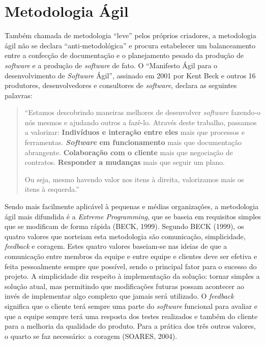 \chapter[Metodologia Ágil]{Metodologia Ágil}
Também chamada de metodologia “leve” pelos próprios criadores, a metodologia ágil não se declara “anti-metodológica” e procura estabelecer um balanceamento entre a confecção de documentação e o planejamento pesado da produção de \textit{software} e a produção de \textit{software} de fato. O “Manifesto Ágil para o desenvolvimento de \textit{Software} Ágil”, assinado em 2001 por Kent Beck  e outros 16 produtores, desenvolvedores e consultores de \textit{software}, declara as seguintes palavras:
\begin{quotation}
“Estamos descobrindo maneiras melhores de desenvolver \textit{software} fazendo-o nós mesmos e ajudando outros a fazê-lo. Através deste trabalho, passamos a valorizar:
	\textbf{Indivíduos e interação entre eles} mais que processos e ferramentas.
	\textbf{\textit{Software} em funcionamento} mais que documentação abrangente.
	\textbf{Colaboração com o cliente} mais que negociação de contratos.
	\textbf{Responder a mudanças} mais que seguir um plano.

Ou seja, mesmo havendo valor nos itens à direita, valorizamos mais os itens à esquerda.”
\end{quotation}

Sendo mais facilmente aplicável à pequenas e médias organizações, a metodologia ágil mais difundida é a \textit{Extreme Programming}, que se baseia em requisitos simples que se modificam de forma rápida (BECK, 1999). Segundo BECK (1999), os quatro valores que norteiam esta metodologia são comunicação, simplicidade, \textit{feedback} e coragem. Estes quatro valores baseiam-se nas ideias de que a comunicação entre membros da equipe e entre equipe e clientes deve ser efetiva e feita pessoalmente sempre que possível, sendo o principal fator para o sucesso do projeto. A simplicidade diz respeito à implementação da solução: tornar simples a solução atual, mas permitindo que modificações futuras possam acontecer ao invés de implementar algo complexo que jamais será utilizado. O \textit{feedback} significa que o cliente terá sempre uma parte do \textit{software} funcional para avaliar e que a equipe sempre terá uma resposta dos testes realizados e também do cliente para a melhoria da qualidade do produto. Para a prática dos três outros valores, o quarto se faz necessário: a coragem (SOARES, 2004).

